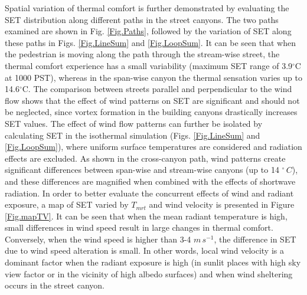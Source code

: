 \documentclass[smallextended]{svjour3}
\newcommand{\degree}{\ensuremath{^\circ}}
\begin{document}
Spatial variation of thermal comfort is further demonstrated by evaluating the SET distribution along different paths in the street canyons. The two paths examined are shown in Fig. \ref{Fig.Paths}, followed by the variation of SET along these paths in Figs. \ref{Fig.LineSum} and \ref{Fig.LoopSum}. It can be seen that when the pedestrian is moving along the path through the stream-wise street, the thermal comfort experience has a small variability (maximum SET range of 3.9$^{\circ}$C at 1000 PST), whereas in the span-wise canyon the thermal sensation varies up to 14.6$^{\circ}$C. The comparison between streets parallel and perpendicular to the wind flow shows that the effect of wind patterns on SET are significant and should not be neglected, since vortex formation in the building canyons drastically increases SET values.  The effect of wind flow patterns can further be isolated by calculating SET in the isothermal simulation (Figs. \ref{Fig.LineSum} and \ref{Fig.LoopSum}), where uniform surface temperatures are considered and radiation effects are excluded.  As shown in the cross-canyon path, wind patterns create significant differences between span-wise and stream-wise canyons (up to 14 $\degree\,C$), and these differences are magnified when combined with the effects of shortwave radiation. In order to better evaluate the concurrent effects of wind and radiant exposure, a map of SET varied by $T_{mrt}$ and wind velocity is presented in Figure \ref{Fig.mapTV}. It can be seen that when the mean radiant temperature is high, small differences in wind speed result in large changes in thermal comfort. Conversely, when the wind speed is higher than 3-4 $m\,s^{-1}$, the difference in SET due to wind speed alteration is small. In other words, local wind velocity is a dominant factor when the radiant exposure is high (in sunlit places with high sky view factor or in the vicinity of high albedo surfaces) and when wind sheltering occurs in the street canyon. 
\end{document}
